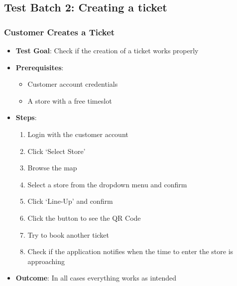 \clearpage

\subsection{Test Batch 2: Creating a ticket}
\subsubsection{Customer Creates a Ticket}
\begin{itemize}
    \item \textbf{Test Goal}: Check if the creation of a ticket works properly
    \item \textbf{Prerequisites}:
          \begin{itemize}
              \item Customer account credentials
              \item A store with a free timeslot
          \end{itemize}
    \item \textbf{Steps}:
          \begin{enumerate}
              \item Login with the customer account
              \item Click `Select Store'
              \item Browse the map
              \item Select a store from the dropdown menu and confirm
              \item Click `Line-Up' and confirm
              \item Click the button to see the QR Code
              \item Try to book another ticket
              \item Check if the application notifies when the time to enter the store is approaching
          \end{enumerate}
    \item \textbf{Outcome}: In all cases everything works as intended
\end{itemize}
